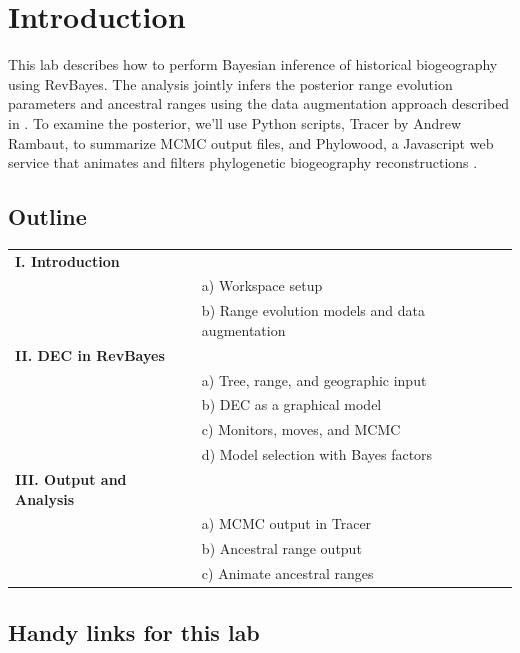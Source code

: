 
\section{Introduction}

This lab describes how to perform Bayesian inference of historical biogeography using RevBayes. The analysis jointly infers the posterior range evolution parameters and ancestral ranges using the data augmentation approach described in \citet{landis13}.
To examine the posterior, we'll use Python scripts, Tracer by Andrew Rambaut, to summarize MCMC output files, and Phylowood, a Javascript web service that animates and filters phylogenetic biogeography reconstructions \citep{landis14}.


\subsection*{\textbf{Outline}}
\begin{tabular}{ll}
{\bf I. Introduction} & \\
& a) Workspace setup \\
& b) Range evolution models and data augmentation \\
{\bf II. DEC in RevBayes} & \\
& a) Tree, range, and geographic input \\
& b) DEC as a graphical model \\
& c) Monitors, moves, and MCMC \\
& d) Model selection with Bayes factors \\
{\bf III. Output and Analysis} & \\
& a) MCMC output in Tracer \\
& b) Ancestral range output \\
& c) Animate ancestral ranges \\
\end{tabular}


\subsection{Handy links for this lab}

